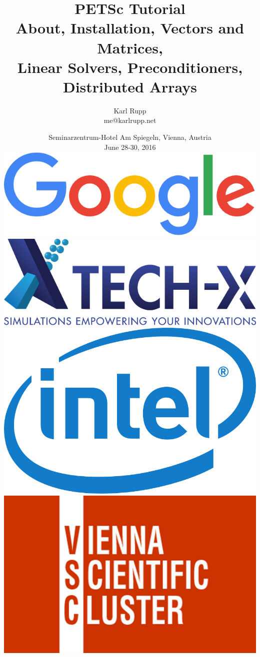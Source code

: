 \documentclass[usepdftitle=false,9pt]{beamer}
\author[Karl Rupp]{Karl Rupp \\ \ttfamily me@karlrupp.net}
\institute[ANL]
{ \footnotesize
  Freelance Computational Scientist \\
}
\title[PETSc]{ { { \Huge PETSc Tutorial } \\ About, Installation, Vectors and Matrices, \\
                                             Linear Solvers, Preconditioners, Distributed Arrays } %
             }
\date[PETSc 2016, June 28-30, 2016]{ \footnotesize Seminarzentrum-Hotel Am Spiegeln, Vienna, Austria \\[1em] June 28-30, 2016 \\[2em]
  \hspace*{-2cm} 
  \includegraphics[height=.9cm]{figures/google} \hspace*{1cm}
  \includegraphics[height=.9cm]{figures/tech-x} \hspace*{1cm}
  \includegraphics[height=.9cm]{figures/intel}  \hspace*{1cm}
  \includegraphics[height=.9cm]{figures/vsc}
  }
\begin{document}
\begin{frame}[plain]
 \frametitle{~}
 \titlepage
\end{frame}


\end{document}

